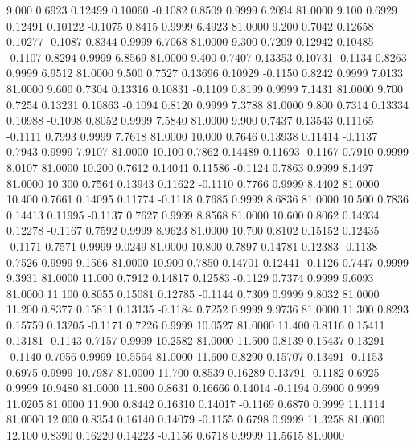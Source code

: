    9.000   0.6923   0.12499   0.10060  -0.1082   0.8509   0.9999   6.2094  81.0000
   9.100   0.6929   0.12491   0.10122  -0.1075   0.8415   0.9999   6.4923  81.0000
   9.200   0.7042   0.12658   0.10277  -0.1087   0.8344   0.9999   6.7068  81.0000
   9.300   0.7209   0.12942   0.10485  -0.1107   0.8294   0.9999   6.8569  81.0000
   9.400   0.7407   0.13353   0.10731  -0.1134   0.8263   0.9999   6.9512  81.0000
   9.500   0.7527   0.13696   0.10929  -0.1150   0.8242   0.9999   7.0133  81.0000
   9.600   0.7304   0.13316   0.10831  -0.1109   0.8199   0.9999   7.1431  81.0000
   9.700   0.7254   0.13231   0.10863  -0.1094   0.8120   0.9999   7.3788  81.0000
   9.800   0.7314   0.13334   0.10988  -0.1098   0.8052   0.9999   7.5840  81.0000
   9.900   0.7437   0.13543   0.11165  -0.1111   0.7993   0.9999   7.7618  81.0000
  10.000   0.7646   0.13938   0.11414  -0.1137   0.7943   0.9999   7.9107  81.0000
  10.100   0.7862   0.14489   0.11693  -0.1167   0.7910   0.9999   8.0107  81.0000
  10.200   0.7612   0.14041   0.11586  -0.1124   0.7863   0.9999   8.1497  81.0000
  10.300   0.7564   0.13943   0.11622  -0.1110   0.7766   0.9999   8.4402  81.0000
  10.400   0.7661   0.14095   0.11774  -0.1118   0.7685   0.9999   8.6836  81.0000
  10.500   0.7836   0.14413   0.11995  -0.1137   0.7627   0.9999   8.8568  81.0000
  10.600   0.8062   0.14934   0.12278  -0.1167   0.7592   0.9999   8.9623  81.0000
  10.700   0.8102   0.15152   0.12435  -0.1171   0.7571   0.9999   9.0249  81.0000
  10.800   0.7897   0.14781   0.12383  -0.1138   0.7526   0.9999   9.1566  81.0000
  10.900   0.7850   0.14701   0.12441  -0.1126   0.7447   0.9999   9.3931  81.0000
  11.000   0.7912   0.14817   0.12583  -0.1129   0.7374   0.9999   9.6093  81.0000
  11.100   0.8055   0.15081   0.12785  -0.1144   0.7309   0.9999   9.8032  81.0000
  11.200   0.8377   0.15811   0.13135  -0.1184   0.7252   0.9999   9.9736  81.0000
  11.300   0.8293   0.15759   0.13205  -0.1171   0.7226   0.9999  10.0527  81.0000
  11.400   0.8116   0.15411   0.13181  -0.1143   0.7157   0.9999  10.2582  81.0000
  11.500   0.8139   0.15437   0.13291  -0.1140   0.7056   0.9999  10.5564  81.0000
  11.600   0.8290   0.15707   0.13491  -0.1153   0.6975   0.9999  10.7987  81.0000
  11.700   0.8539   0.16289   0.13791  -0.1182   0.6925   0.9999  10.9480  81.0000
  11.800   0.8631   0.16666   0.14014  -0.1194   0.6900   0.9999  11.0205  81.0000
  11.900   0.8442   0.16310   0.14017  -0.1169   0.6870   0.9999  11.1114  81.0000
  12.000   0.8354   0.16140   0.14079  -0.1155   0.6798   0.9999  11.3258  81.0000
  12.100   0.8390   0.16220   0.14223  -0.1156   0.6718   0.9999  11.5615  81.0000
